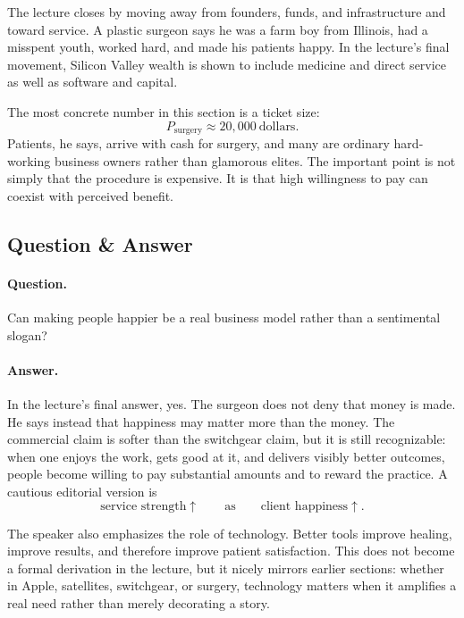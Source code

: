 The lecture closes by moving away from founders, funds, and infrastructure and toward service. A plastic surgeon says he was a farm boy from Illinois, had a misspent youth, worked hard, and made his patients happy. In the lecture's final movement, Silicon Valley wealth is shown to include medicine and direct service as well as software and capital.

The most concrete number in this section is a ticket size:
\begin{equation}
P_{\text{surgery}} \approx 20{,}000 \ \text{dollars}.
\end{equation}
Patients, he says, arrive with cash for surgery, and many are ordinary hard-working business owners rather than glamorous elites. The important point is not simply that the procedure is expensive. It is that high willingness to pay can coexist with perceived benefit.

\subsection{Question \& Answer}

\paragraph{Question.} Can making people happier be a real business model rather than a sentimental slogan?

\paragraph{Answer.} In the lecture's final answer, yes. The surgeon does not deny that money is made. He says instead that happiness may matter more than the money. The commercial claim is softer than the switchgear claim, but it is still recognizable: when one enjoys the work, gets good at it, and delivers visibly better outcomes, people become willing to pay substantial amounts and to reward the practice. A cautious editorial version is
\begin{equation}
\text{service strength} \uparrow
\qquad \text{as} \qquad
\text{client happiness} \uparrow.
\end{equation}

The speaker also emphasizes the role of technology. Better tools improve healing, improve results, and therefore improve patient satisfaction. This does not become a formal derivation in the lecture, but it nicely mirrors earlier sections: whether in Apple, satellites, switchgear, or surgery, technology matters when it amplifies a real need rather than merely decorating a story.

